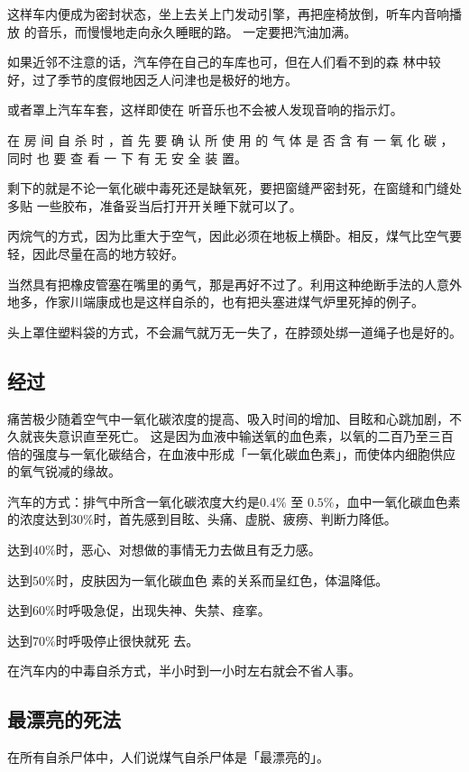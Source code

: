 \documentclass[UTF8]{ctexart}
\begin{document}
这样车内便成为密封状态，坐上去关上门发动引擎，再把座椅放倒，听车内音响播放 的音乐，而慢慢地走向永久睡眠的路。 一定要把汽油加满。

如果近邻不注意的话，汽车停在自己的车库也可，但在人们看不到的森 林中较好，过了季节的度假地因乏人问津也是极好的地方。

或者罩上汽车车套，这样即使在 听音乐也不会被人发现音响的指示灯。

在 房 间 自 杀 时 ，首 先 要 确 认 所 使 用 的 气 体 是 否 含 有 一 氧 化 碳 ，同时 也 要 查 看 一 下 有 无 安 全 装 置。

剩下的就是不论一氧化碳中毒死还是缺氧死，要把窗缝严密封死，在窗缝和门缝处多贴 一些胶布，准备妥当后打开开关睡下就可以了。

丙烷气的方式，因为比重大于空气，因此必须在地板上横卧。相反，煤气比空气要轻，因此尽量在高的地方较好。

当然具有把橡皮管塞在嘴里的勇气，那是再好不过了。利用这种绝断手法的人意外地多，作家川端康成也是这样自杀的，也有把头塞进煤气炉里死掉的例子。

头上罩住塑料袋的方式，不会漏气就万无一失了，在脖颈处绑一道绳子也是好的。

\subsection{经过}

痛苦极少随着空气中一氧化碳浓度的提高、吸入时间的增加、目眩和心跳加剧，不久就丧失意识直至死亡。
这是因为血液中输送氧的血色素，以氧的二百乃至三百倍的强度与一氧化碳结合，在血液中形成「一氧化碳血色素」，而使体内细胞供应的氧气锐减的缘故。

汽车的方式：排气中所含一氧化碳浓度大约是$0.4\%$ 至 $0.5\%$，血中一氧化碳血色素的浓度达到$30\%$时，首先感到目眩、头痛、虚脱、疲痨、判断力降低。

达到$40\%$时，恶心、对想做的事情无力去做且有乏力感。

达到$50\%$时，皮肤因为一氧化碳血色 素的关系而呈红色，体温降低。 

达到$60\%$时呼吸急促，出现失神、失禁、痉挛。

达到$70\%$时呼吸停止很快就死 去。 

在汽车内的中毒自杀方式，半小时到一小时左右就会不省人事。

\subsection{最漂亮的死法}

在所有自杀尸体中，人们说煤气自杀尸体是「最漂亮的」。
\end{document}
